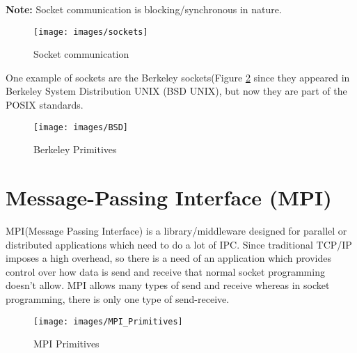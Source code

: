 \documentclass[twoside]{article}
\begin{document}
\textbf{Note:} Socket communication is blocking/synchronous in nature.

\begin{figure}[h]
	\begin{center}
		\texttt{[image: images/sockets]}
		\caption{Socket communication}
		\label{socket_communication}
	\end{center}
\end{figure}

One example of sockets are the Berkeley sockets(Figure \ref{BSD} since they appeared in Berkeley System Distribution UNIX (BSD UNIX), but now they are part of the POSIX standards. 

\begin{figure}[h]
	\begin{center}
		\texttt{[image: images/BSD]}
		\caption{Berkeley Primitives}
		\label{BSD}
	\end{center}
\end{figure}


\section{Message-Passing Interface (MPI)}

MPI(Message Passing Interface) is a library/middleware designed for parallel or distributed applications which need to do a lot of IPC. Since traditional TCP/IP imposes a high overhead, so there is a need of an application which provides control over how data is send and receive that normal socket programming doesn't allow. MPI allows many types of send and receive whereas in socket programming, there is only one type of send-receive.

\begin{figure}[h]
\begin{center}
\texttt{[image: images/MPI\_Primitives]}
\caption{MPI Primitives}
\label{mpi_primitives}
\end{center}
\end{figure}
\end{document}
